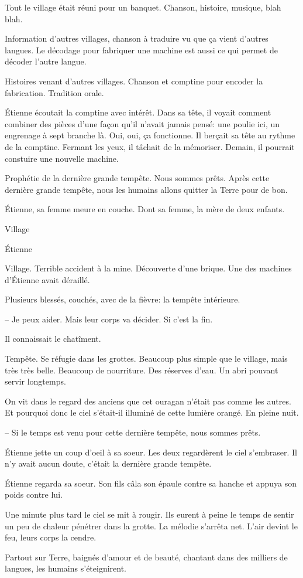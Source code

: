 Tout le village était réuni pour un banquet. Chanson, histoire, musique, blah blah.

Information d'autres villages, chanson à traduire vu que ça vient d'autres langues.
Le décodage pour fabriquer une machine est aussi ce qui permet de décoder l'autre langue.

Histoires venant d'autres villages. Chanson et comptine pour encoder la fabrication. 
Tradition orale.

Étienne écoutait la comptine avec intérêt. Dans sa tête, il voyait comment combiner des pièces d'une
façon qu'il n'avait jamais pensé: une poulie ici, un engrenage à sept branche là. Oui, oui, ça fonctionne.
Il berçait sa tête au rythme de la comptine. Fermant les yeux, il tâchait de la mémoriser.
Demain, il pourrait constuire une nouvelle machine.

Prophétie de la dernière grande tempête. Nous sommes prêts.
Après cette dernière grande tempête, nous les humains allons quitter la Terre pour de bon.

\sautSection{}

Étienne, sa femme meure en couche.
Dont sa femme, la mère de deux enfants.

\sautSection{}

Village 

\sautSection{}

Étienne

\sautSection{}

Village. Terrible accident à la mine. Découverte d'une brique.
Une des machines d'Étienne avait déraillé.

Plusieurs blessés, couchés, avec de la fièvre: la tempête intérieure.


-- Je peux aider. Mais leur corps va décider. Si c'est la fin.

Il connaissait le chatîment.

\sautSection{}

Tempête. Se réfugie dans les grottes. Beaucoup plus simple que le village, mais très très belle.
Beaucoup de nourriture. Des réserves d'eau. Un abri pouvant servir longtemps.

On vit dans le regard des anciens que cet ouragan n'était pas comme les autres.
Et pourquoi donc le ciel s'était-il illuminé de cette lumière orangé. En pleine nuit.

-- Si le temps est venu pour cette dernière tempête, nous sommes prêts.

Étienne jette un coup d'oeil à sa soeur. Les deux regardèrent le ciel s'embraser.
Il n'y avait aucun doute, c'était la dernière grande tempête.

Étienne regarda sa soeur. Son fils câla son épaule contre sa hanche et appuya son poids contre lui.

Une minute plus tard le ciel se mit à rougir.  
%
Ils eurent à peine le temps de
sentir un peu de chaleur pénétrer dans la grotte. 
%
La mélodie s'arrêta net.
%
L'air devint le feu, leurs corps la cendre.


Partout sur Terre, baignés d'amour et de beauté, chantant dans des milliers de langues, les humains s'éteignirent.


